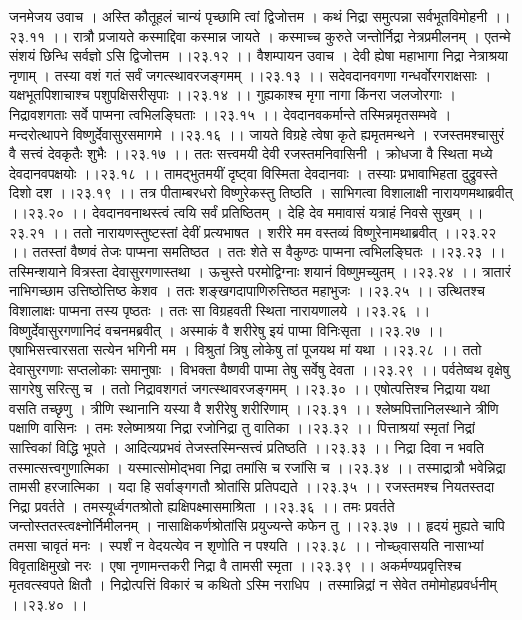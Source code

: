 \documentclass[11pt]{book}
\begin{document}
\begin{landscape}
जनमेजय उवाच ।
अस्ति कौतूहलं चान्यं पृच्छामि त्वां द्विजोत्तम ।
कथं निद्रा समुत्पन्ना सर्वभूतविमोहनी ।।२३.११ ।।
रात्रौ प्रजायते कस्माद्दिवा कस्मान्न जायते ।
कस्माच्च कुरुते जन्तोर्निद्रा नेत्रप्रमीलनम् ।
एतन्मे संशयं छिन्धि सर्वज्ञो ऽसि द्विजोत्तम ।।२३.१२ ।।
वैशम्पायन उवाच ।
देवी ह्येषा महाभागा निद्रा नेत्राश्रया नृणाम् ।
तस्या वशं गतं सर्वं जगत्स्थावरजङ्गमम् ।।२३.१३ ।।
सदेवदानवगणा गन्धर्वोरगराक्षसाः ।
यक्षभूतपिशाचाश्च पशुपक्षिसरीसृपाः ।।२३.१४ ।।
गुह्यकाश्च मृगा नागा किंनरा जलजोरगाः ।
निद्रावशगताः सर्वे पाप्मना त्वभिलङ्घिताः ।।२३.१५ ।।
देवदानवकर्मान्ते तस्मिन्नमृतसम्भवे ।
मन्दरोत्थापने विष्णुर्देवासुरसमागमे ।।२३.१६ ।।
जायते विग्रहे त्वेषा कृते ह्यमृतमन्थने ।
रजस्तमश्चासुरं वै सत्त्वं देवकृतैः शुभैः ।।२३.१७ ।।
ततः सत्त्वमयी देवी रजस्तमनिवासिनी ।
क्रोधजा वै स्थिता मध्ये देवदानवपक्षयोः ।।२३.१८ ।।
तामद्भुतमयीं दृष्ट्वा विस्मिता देवदानवाः ।
तस्याः प्रभावाभिहता दुद्रुवस्ते दिशो दश ।।२३.१९ ।।
तत्र पीताम्बरधरो विष्णुरेकस्तु तिष्ठति ।
साभिगत्वा विशालाक्षी नारायणमथाब्रवीत् ।।२३.२० ।।
देवदानवनाथस्त्वं त्वयि सर्वं प्रतिष्ठितम् ।
देहि देव ममावासं यत्राहं निवसे सुखम् ।।२३.२१ ।।
ततो नारायणस्तुष्टस्तां देवीं प्रत्यभाषत ।
शरीरे मम वस्तव्यं विष्णुरेनामथाब्रवीत् ।।२३.२२ ।।
ततस्तां वैष्णवं तेजः पाप्मना समतिष्ठत ।
ततः शेते स वैकुण्ठः पाप्मना त्वभिलङ्घितः ।।२३.२३ ।।
तस्मिन्शयाने वित्रस्ता देवासुरगणास्तथा ।
ऊचुस्ते परमोद्विग्नाः शयानं विष्णुमच्युतम् ।।२३.२४ ।।
त्रातारं नाभिगच्छाम उत्तिष्ठोत्तिष्ठ केशव ।
ततः शङ्खगदापाणिरुत्तिष्ठत महाभुजः ।।२३.२५ ।।
उत्थितश्च विशालाक्षः पाप्मना तस्य पृष्ठतः ।
ततः सा विग्रहवती स्थिता नारायणालये ।।२३.२६ ।।
विष्णुर्देवासुरगणानिदं वचनमब्रवीत् ।
अस्माकं वै शरीरेषु इयं पाप्मा विनिःसृता ।।२३.२७ ।।
एषाभिसत्त्वारसता सत्येन भगिनी मम ।
विश्रुतां त्रिषु लोकेषु तां पूजयथ मां यथा ।।२३.२८ ।।
ततो देवासुरगणाः सप्तलोकाः समानुषाः ।
विभक्ता वैष्णवी पाप्मा तेषु सर्वेषु देवता ।।२३.२९ ।।
पर्वतेष्वथ वृक्षेषु सागरेषु सरित्सु च ।
ततो निद्रावशगतं जगत्स्थावरजङ्गमम् ।।२३.३० ।।
एषोत्पत्तिश्च निद्राया यथा वसति तच्छृणु ।
त्रीणि स्थानानि यस्या वै शरीरेषु शरीरिणाम् ।।२३.३१ ।।
श्लेष्मपित्तानिलस्थाने त्रीणि पक्षाणि वासिनः ।
तमः श्लेष्माश्रया निद्रा रजोनिद्रा तु वातिका ।।२३.३२ ।।
पित्ताश्रयां स्मृतां निद्रां सात्त्विकां विद्धि भूपते ।
आदित्यप्रभवं तेजस्तस्मिन्सत्त्वं प्रतिष्ठति ।।२३.३३ ।।
निद्रा दिवा न भवति तस्मात्सत्त्वगुणात्मिका ।
यस्मात्सोमोद्भवा निद्रा तमांसि च रजांसि च ।।२३.३४ ।।
तस्माद्रात्रौ भवेन्निद्रा तामसी हरजात्मिका ।
यदा हि सर्वाङ्गगतौ श्रोतांसि प्रतिपद्यते ।।२३.३५ ।।
रजस्तमश्च नियतस्तदा निद्रा प्रवर्तते ।
तमस्यूर्ध्वगतश्रोतो ह्यक्षिपक्ष्मासमाश्रिता ।।२३.३६ ।।
तमः प्रवर्तते जन्तोस्ततस्त्वक्ष्नोर्निमीलनम् ।
नासाक्षिकर्णश्रोतांसि प्रयुज्यन्ते कफेन तु ।।२३.३७ ।।
हृदयं मुह्यते चापि तमसा चावृतं मनः ।
स्पर्शं न वेदयत्येव न शृणोति न पश्यति ।।२३.३८ ।।
नोच्छ्वासयति नासाभ्यां विवृताक्षिमुखो नरः ।
एषा नृणामन्तकरी निद्रा वै तामसी स्मृता ।।२३.३९ ।।
अकर्मण्यप्रवृत्तिश्च मृतवत्स्वपते क्षितौ ।
निद्रोत्पत्तिं विकारं च कथितो ऽस्मि नराधिप ।
तस्मान्निद्रां न सेवेत तमोमोहप्रवर्धनीम् ।।२३.४० ।।


\end{landscape}
\end{document}
